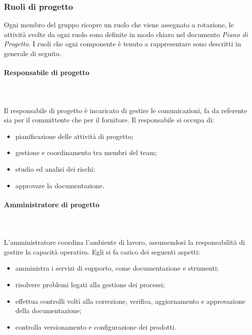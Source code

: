 		\subsubsection{Ruoli di progetto}%
		Ogni membro del gruppo ricopre un ruolo che viene assegnato a rotazione, le attività svolte da ogni ruolo sono definite in modo chiaro nel documento \textit{Piano di Progetto}.
		I ruoli che ogni componente è tenuto a rappresentare sono descritti in generale di seguito.
			\paragraph{Responsabile di progetto} \mbox{}\\ \mbox{}\\
			Il responsabile di progetto è incaricato di gestire le comunicazioni, fa da referente sia per il committente che per il fornitore.\newline
			Il responsabile si occupa di:
			\begin{itemize}
				\item pianificazione delle attività di progetto;
				\item  gestione e coordinamento tra membri del team;
				\item studio ed analisi dei rischi;
				\item approvare la documentazione.
			\end{itemize}
			\paragraph{Amministratore di progetto} \mbox{}\\ \mbox{}\\
			L'amministratore coordina l'ambiente di lavoro, assumendosi la responsabilità di gestire la capacità operativa.\newline
			Egli si fa carico dei seguenti aspetti:
			\begin{itemize}
				\item amministra i servizi di supporto, come documentazione e strumenti;
				\item risolvere problemi legati alla gestione dei processi;
				\item effettua controlli volti alla correzione, verifica, aggiornamento e approvazione della documentazione;
				\item controlla versionamento e configurazione dei prodotti.
			\end{itemize}
